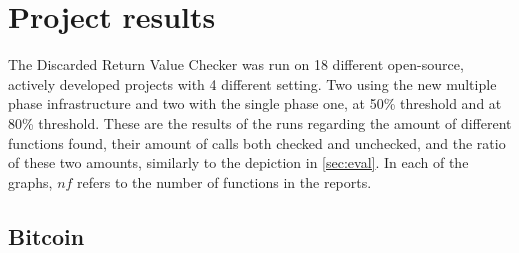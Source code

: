 
\chapter{Project results}
\label{appx:diagrams}

The Discarded Return Value Checker was run on 18 different open-source, actively developed projects with 4 different setting.
Two using the new multiple phase infrastructure and two with the single phase one, at 50\% threshold and at 80\% threshold.
These are the results of the runs regarding the amount of different functions found, their amount of calls both checked
and unchecked, and the ratio of these two amounts, similarly to the depiction in \cref{sec:eval}.
In each of the graphs, $nf$ refers to the number of functions in the reports.


\pagebreak

\section*{Bitcoin}

\begin{figure}[H]
\end{figure}

\begin{figure}[H]
\end{figure}

